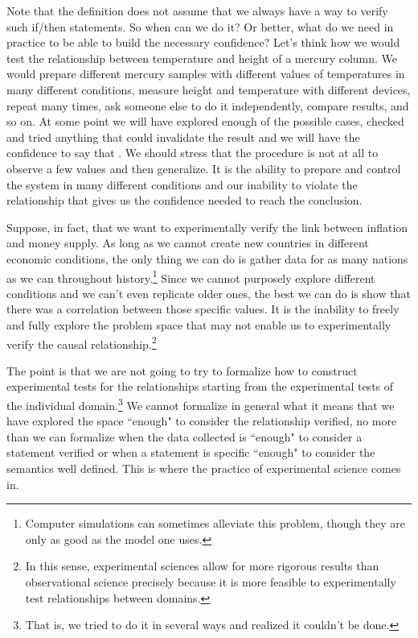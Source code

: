 \documentclass[11pt,letterpaper,fleqn]{memoir} %
\begin{document}
Note that the definition does not assume that we always have a way to verify such if/then statements. So when can we do it? Or better, what do we need in practice to be able to build the necessary confidence? Let's think how we would test the relationship between temperature and height of a mercury column. We would prepare different mercury samples with different values of temperatures in many different conditions, measure height and temperature with different devices, repeat many times, ask someone else to do it independently, compare results, and so on. At some point we will have explored enough of the possible cases, checked and tried anything that could invalidate the result and we will have the confidence to say that . We should stress that the procedure is not at all to observe a few values and then generalize. It is the ability to prepare and control the system in many different conditions and our inability to violate the relationship that gives us the confidence needed to reach the conclusion.

Suppose, in fact, that we want to experimentally verify the link between inflation and money supply. As long as we cannot create new countries in different economic conditions, the only thing we can do is gather data for as many nations as we can throughout history.\footnote{Computer simulations can sometimes alleviate this problem, though they are only as good as the model one uses.} Since we cannot purposely explore different conditions and we can't even replicate older ones, the best we can do is show that there was a correlation between those specific values. It is the inability to freely and fully explore the problem space that may not enable us to experimentally verify the causal relationship.\footnote{In this sense, experimental sciences allow for more rigorous results than observational science precisely because it is more feasible to experimentally test relationships between domains.}

The point is that we are not going to try to formalize how to construct experimental tests for the relationships starting from the experimental tests of the individual domain.\footnote{That is, we tried to do it in several ways and realized it couldn't be done.} We cannot formalize in general what it means that we have explored the space ``enough" to consider the relationship verified, no more than we can formalize when the data collected is ``enough" to consider a statement verified or when a statement is specific ``enough" to consider the semantics well defined. This is where the practice of experimental science comes in.
\end{document}
